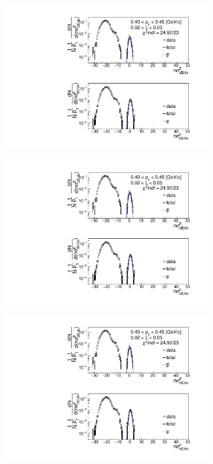 \begin{figure}[h!]
\begin{subfigure}{.32\textwidth}
		\includegraphics[width=\linewidth, page=6]{chapters/chrgSTAR/img/dEdx/fit2019_thirdStep_2_0.pdf}
	\end{subfigure}
	\begin{subfigure}{.32\textwidth}
		\includegraphics[width=\linewidth, page=7]{chapters/chrgSTAR/img/dEdx/fit2019_thirdStep_2_0.pdf}
	\end{subfigure}
	\begin{subfigure}{.32\textwidth}
		\includegraphics[width=\linewidth, page=8]{chapters/chrgSTAR/img/dEdx/fit2019_thirdStep_2_0.pdf}

\end{subfigure}
\end{figure}
